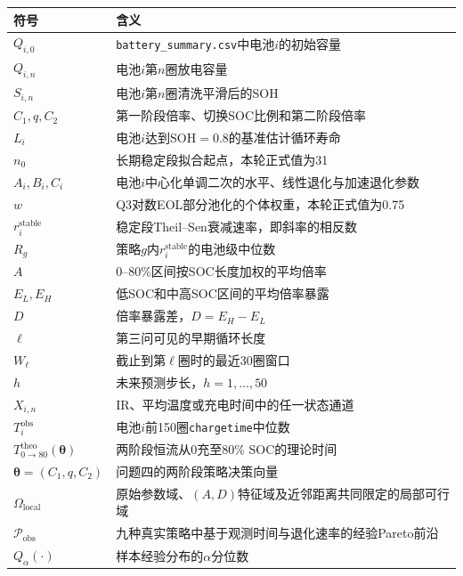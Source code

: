 \documentclass[withoutpreface]{cumcmthesis}
\newcommand{\SOH}{\mathrm{SOH}}
\begin{document}
\begin{table}[H]
\centering
{}
\begin{tabularx}{\textwidth}{lX}
\toprule
\rowcolor{TableHeader}
符号 & 含义 \\
\midrule
$Q_{i,0}$ & \texttt{battery\_summary.csv}中电池$i$的初始容量 \\
$Q_{i,n}$ & 电池$i$第$n$圈放电容量 \\
$S_{i,n}$ & 电池$i$第$n$圈清洗平滑后的SOH \\
$C_1,q,C_2$ & 第一阶段倍率、切换SOC比例和第二阶段倍率 \\
$L_i$ & 电池$i$达到$\SOH=0.8$的基准估计循环寿命 \\
$n_0$ & 长期稳定段拟合起点，本轮正式值为31 \\
$A_i,B_i,C_i$ & 电池$i$中心化单调二次的水平、线性退化与加速退化参数 \\
$w$ & Q3对数EOL部分池化的个体权重，本轮正式值为0.75 \\
$r_i^{\mathrm{stable}}$ & 稳定段Theil--Sen衰减速率，即斜率的相反数 \\
$R_g$ & 策略$g$内$r_i^{\mathrm{stable}}$的电池级中位数 \\
$A$ & 0--80\%区间按SOC长度加权的平均倍率 \\
$E_L,E_H$ & 低SOC和中高SOC区间的平均倍率暴露 \\
$D$ & 倍率暴露差，$D=E_H-E_L$ \\
$\ell$ & 第三问可见的早期循环长度 \\
$W_{\ell}$ & 截止到第$\ell$圈时的最近30圈窗口 \\
$h$ & 未来预测步长，$h=1,\ldots,50$ \\
$X_{i,n}$ & IR、平均温度或充电时间中的任一状态通道 \\
$T_i^{\mathrm{obs}}$ & 电池$i$前150圈\texttt{chargetime}中位数 \\
$T_{0\rightarrow80}^{\mathrm{theo}}(\boldsymbol\theta)$ & 两阶段恒流从0充至80\% SOC的理论时间 \\
$\boldsymbol\theta=(C_1,q,C_2)$ & 问题四的两阶段策略决策向量 \\
$\Omega_{\mathrm{local}}$ & 原始参数域、$(A,D)$特征域及近邻距离共同限定的局部可行域 \\
$\mathcal P_{\mathrm{obs}}$ & 九种真实策略中基于观测时间与退化速率的经验Pareto前沿 \\
$Q_\alpha(\cdot)$ & 样本经验分布的$\alpha$分位数 \\
\bottomrule
\end{tabularx}
\end{table}
\end{document}
